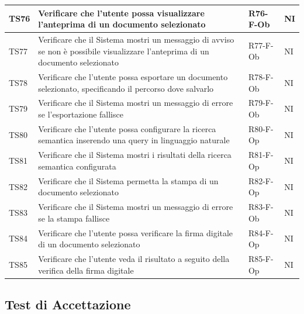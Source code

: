 \documentclass[a4paper,12pt]{article}
\begin{document}
\begin{longtable}{|M{1.2cm}|M{6.3cm}|M{2.5cm}|M{1.5cm}|}
                TS76 & Verificare che l'utente possa visualizzare l'anteprima di un documento selezionato & R76-F-Ob & NI \\
                \hline

                TS77 & Verificare che il Sistema mostri un messaggio di avviso se non è possibile visualizzare l'anteprima di un documento selezionato & R77-F-Ob & NI \\
                \hline

                TS78 & Verificare che l'utente possa esportare un documento selezionato, specificando il percorso dove salvarlo & R78-F-Ob & NI \\
                \hline

                TS79 & Verificare che il Sistema mostri un messaggio di errore se l'esportazione fallisce & R79-F-Ob & NI \\
                \hline

                TS80 & Verificare che l'utente possa configurare la ricerca semantica inserendo una query in linguaggio naturale & R80-F-Op & NI \\
                \hline

                TS81 & Verificare che il Sistema mostri i risultati della ricerca semantica configurata & R81-F-Op & NI \\
                \hline

                TS82 & Verificare che il Sistema permetta la stampa di un documento selezionato & R82-F-Op & NI \\
                \hline

                TS83 & Verificare che il Sistema mostri un messaggio di errore se la stampa fallisce & R83-F-Ob & NI \\
                \hline

                TS84 & Verificare che l'utente possa verificare la firma digitale di un documento selezionato & R84-F-Op & NI \\
                \hline

                TS85 & Verificare che l'utente veda il risultato a seguito della verifica della firma digitale & R85-F-Op & NI \\
                \hline

            \end{longtable}

        \subsection{Test di Accettazione}
        
\end{document}
